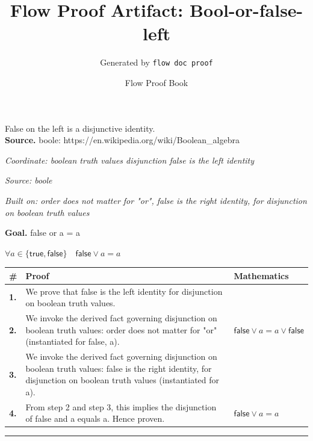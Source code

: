 \documentclass[11pt]{article}
\title{Flow Proof Artifact: Bool-or-false-left}
\author{Generated by \texttt{flow doc proof}}
\date{Flow Proof Book}
\theoremstyle{definition}
\begin{document}
\maketitle
False on the left is a disjunctive identity.\\[0.5em]
\textbf{Source.} boole: https://en.wikipedia.org/wiki/Boolean\_algebra\\[0.5em]
\bigskip
{}\par
\smallskip\noindent\textit{Coordinate: boolean truth values \cdot disjunction \cdot false is the left identity}\par
\smallskip\noindent\textit{Source: boole}\par
\smallskip\noindent\textit{Built on: order does not matter for "or", false is the right identity, for disjunction on boolean truth values}\par
\medskip
\noindent\textbf{Goal.} false or a = a\par
\noindent$\displaystyle \forall a \in \{\mathsf{true}, \mathsf{false}\}\quad \mathsf{false} \lor a = a$\par
\medskip
\noindent
\begin{tabular}{@{} >{\raggedright\arraybackslash}p{} >{\raggedright\arraybackslash}p{} >{\raggedleft\arraybackslash}p{} @{}}
\textbf{\#} & \textbf{Proof} & \textbf{Mathematics} \\
\midrule
\textbf{1.} & We prove that false is the left identity for disjunction on boolean truth values. & \\[0.45em]
\textbf{2.} & We invoke the derived fact governing disjunction on boolean truth values: order does not matter for "or" (instantiated for false, a). & $\displaystyle \mathsf{false} \lor a = a \lor \mathsf{false}$ \\[0.45em]
\textbf{3.} & We invoke the derived fact governing disjunction on boolean truth values: false is the right identity, for disjunction on boolean truth values (instantiated for a). & \\[0.45em]
\textbf{4.} & From step 2 and step 3, this implies the disjunction of false and a equals a. Hence proven. & $\displaystyle \mathsf{false} \lor a = a$ \\[0.45em]
\bottomrule
\end{tabular}
\label{thm:Bool-disjunction-false_is_the_left_identity}
\par\medskip\hrule
\end{document}
